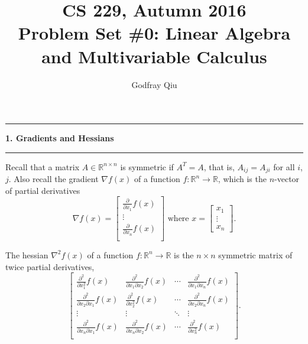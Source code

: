 \documentclass[11pt]{article}
\newcommand\question[2]{\vspace{.25in}\hrule\textbf{#1. #2}\vspace{.5em}\hrule\vspace{.10in}}
\begin{document}
\newcommand\NAME{Godfray Qiu}     %
\newcommand\STUID{}               %
\newcommand\HWNUM{0}              %



\title{\bfseries \sffamily CS 229, Autumn 2016\\Problem Set \#\HWNUM: Linear Algebra and Multivariable Calculus}
\author{\sffamily \NAME}

\maketitle


\question{1}{Gradients and Hessians}
Recall that a matrix $A\in \mathbb{R}^{n\times n}$ is symmetric if $A^T = A$, that is, $A_{ij} = A_{ji}$ for all $i$, $j$. Also recall the gradient $\nabla f(x)$ of a function $f: \mathbb{R}^n \rightarrow \mathbb{R}$, which is the $n$-vector of partial derivatives $$\nabla f(x) = \left[
                                         \begin{array}{c}
                                           \frac{\partial}{\partial x_1}f(x) \\
                                           \vdots \\
                                           \frac{\partial}{\partial x_n}f(x) \\
                                         \end{array}
                                       \right]
\text{ where } x = \left[
                    \begin{array}{c}
                     x_1 \\
                     \vdots \\
                     x_n
                   \end{array}
                   \right].$$

The hessian $\nabla^2f(x)$ of a function $f: \mathbb{R}^n \rightarrow \mathbb{R}$ is the $n\times n$ symmetric matrix of twice partial derivatives,$$\left[
                                 \begin{array}{cccc}
                                   \frac{\partial^2}{\partial x_1^2}f(x) & \frac{\partial^2}{\partial x_1\partial x_2}f(x) & \cdots & \frac{\partial^2}{\partial x_1\partial x_n}f(x) \\
                                   \frac{\partial^2}{\partial x_2\partial x_1}f(x) & \frac{\partial^2}{\partial x_2^2}f(x) & \cdots & \frac{\partial^2}{\partial x_2\partial x_n}f(x) \\
                                   \vdots & \vdots & \ddots & \vdots \\
                                   \frac{\partial^2}{\partial x_n \partial x_1}f(x) & \frac{\partial^2}{\partial x_n \partial x_2}f(x) & \cdots & \frac{\partial^2}{\partial x_n^2}f(x) \\
                                 \end{array}
                               \right].$$
\end{document}
